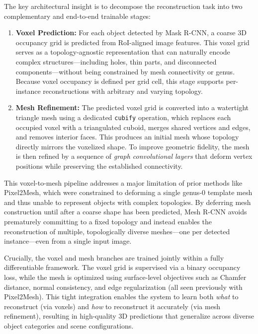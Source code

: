 The key architectural insight is to decompose the reconstruction task into two complementary and end-to-end trainable stages:

\begin{enumerate}
    \item \textbf{Voxel Prediction:} For each object detected by Mask R-CNN, a coarse 3D occupancy grid is predicted from RoI-aligned image features. This voxel grid serves as a topology-agnostic representation that can naturally encode complex structures—including holes, thin parts, and disconnected components—without being constrained by mesh connectivity or genus. Because voxel occupancy is defined per grid cell, this stage supports per-instance reconstructions with arbitrary and varying topology.
    
    \item \textbf{Mesh Refinement:} The predicted voxel grid is converted into a watertight triangle mesh using a dedicated \texttt{cubify} operation, which replaces each occupied voxel with a triangulated cuboid, merges shared vertices and edges, and removes interior faces. This produces an initial mesh whose topology directly mirrors the voxelized shape. To improve geometric fidelity, the mesh is then refined by a sequence of \emph{graph convolutional layers} that deform vertex positions while preserving the established connectivity.
\end{enumerate}

This voxel-to-mesh pipeline addresses a major limitation of prior methods like Pixel2Mesh, which were constrained to deforming a single genus-0 template mesh and thus unable to represent objects with complex topologies. By deferring mesh construction until after a coarse shape has been predicted, Mesh R-CNN avoids prematurely committing to a fixed topology and instead enables the reconstruction of multiple, topologically diverse meshes—one per detected instance—even from a single input image.

Crucially, the voxel and mesh branches are trained jointly within a fully differentiable framework. The voxel grid is supervised via a binary occupancy loss, while the mesh is optimized using surface-level objectives such as Chamfer distance, normal consistency, and edge regularization (all seen previously with Pixel2Mesh). This tight integration enables the system to learn both \emph{what} to reconstruct (via voxels) and \emph{how} to reconstruct it accurately (via mesh refinement), resulting in high-quality 3D predictions that generalize across diverse object categories and scene configurations.

